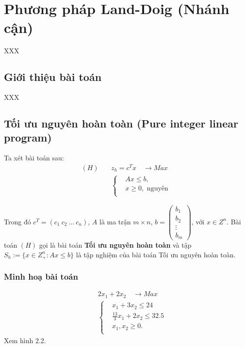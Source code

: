\documentclass[12pt,a4paper]{report}
\begin{document}
\section{Phương pháp Land-Doig (Nhánh cận)}
XXX
\subsection{Giới thiệu bài toán}
XXX
\subsection*{Tối ưu nguyên hoàn toàn (Pure integer linear program)}
    Ta xét bài toán sau:
    \begin{equation} \label{H}
        \begin{split}
        (H) \quad & z_h=c^Tx \quad \longrightarrow Max \\
                  & \left\{\begin{split}
                    &Ax \leq  b, \\
                    &x \geq 0, \text{ nguyên} \\
                    \end{split}\right.    
        \end{split}
        \end{equation}            

    Trong đó $c^T=(c_1 \: c_2 \: \ldots \: c_n)$, $A$ là ma trận $m\times n$, $b=\begin{pmatrix}
        b_1 \\
        b_2 \\
        \vdots \\
        b_m
        \end{pmatrix}$, với $x\in Z^n$. Bài toán $(H)$ gọi là bài toán \textbf{Tối ưu nguyên hoàn toàn} và tập $S_h:=\{x\in Z^n_+: Ax\leq b\}$ là tập nghiệm của bài toán Tối ưu nguyên hoàn toàn.


 \subsubsection*{Minh hoạ bài toán}
    \begin{equation}
        \begin{split}
        \quad & 2x_1 + 2x_2 \quad \longrightarrow Max \\
                    & \left\{\begin{split}
                    & x_1 + 3x_2 \leq 24 \\
                    & \frac{13}{3}x_1 + 2x_2 \leq 32.5 \\
                    &x_1, x_2 \geq 0. \\
                    \end{split}\right.    
        \end{split}
        \end{equation}            
Xem hình 2.2.
\end{document}
